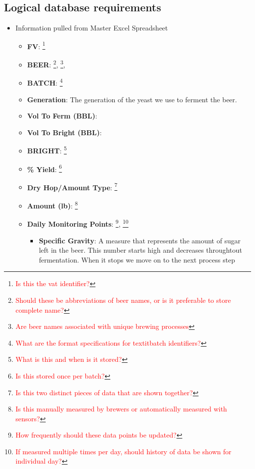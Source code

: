 \documentclass[draftclsnofoot,onecolumn,letterpaper,10pt,compsoc]{IEEEtran}
\newcommand\question[1]{\footnote{\textcolor{red}{#1}}}
\begin{document}
	\subsection{Logical database requirements}
    \begin{itemize}
        \item{Information pulled from Master Excel Spreadsheet}
            \begin{itemize}
                \item{\textbf{FV}:
                    \question{Is this the vat identifier?}
                }
                \item{\textbf{BEER}:
                    \question{Should these be abbreviations of beer names, or is it preferable to store complete name?},
                    \question{Are beer names associated with unique brewing processes},
                }
                \item{\textbf{BATCH}:
                    \question{What are the format specifications for textit{batch identifiers}?}
                }
                \item{\textbf{Generation}:
									The generation of the yeast we use to ferment the beer.
                }
                \item{\textbf{Vol To Ferm (BBL)}:
                }
                \item{\textbf{Vol To Bright (BBL)}:
                }
                \item{\textbf{BRIGHT}:
                    \question{What is this and when is it stored?}
                }
                \item{\textbf{\% Yield}:
                    \question{Is this stored once per batch?}
                }
                \item{\textbf{Dry Hop/Amount Type}:
                    \question{Is this two distinct pieces of data that are shown together?}
                }
                \item{\textbf{Amount (lb)}:
                    \question{Is this manually measured by brewers or automatically measured with sensors?}
                }
                \item{\textbf{Daily Monitoring Points}:
                    \question{How frequently should these data points be updated?},
                    \question{If measured multiple times per day, should history of data be shown for individual day?}
                }
                \begin{itemize}
                    \item{\textbf{Specific Gravity}: A measure that represents the amount of sugar left in the beer. This number starts high and decreases throughtout fermentation. When it stops we move on to the next process step}

\end{itemize}
\end{itemize}
\end{itemize}
\end{document}
